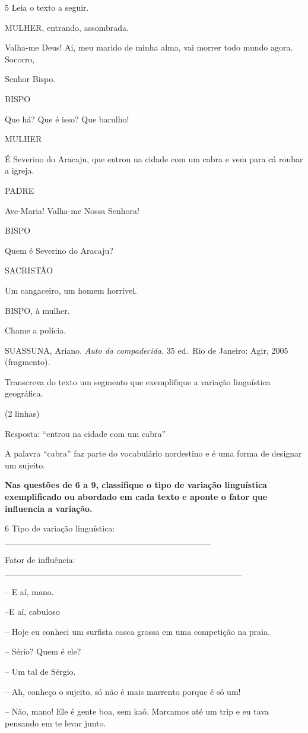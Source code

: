 \num{5} Leia o texto a seguir.

MULHER, entrando, assombrada.

Valha-me Deus! Ai, meu marido de minha alma, vai morrer todo mundo
agora. Socorro,

Senhor Bispo.

BISPO

Que há? Que é isso? Que barulho!

MULHER

É Severino do Aracaju, que entrou na cidade com um cabra e vem para cá
roubar a igreja.

PADRE

Ave-Maria! Valha-me Nossa Senhora!

BISPO

Quem é Severino do Aracaju?

SACRISTÃO

Um cangaceiro, um homem horrível.

BISPO, à mulher.

Chame a polícia.

SUASSUNA, Ariano. \emph{Auto da compadecida.} 35 ed.~Rio de Janeiro:
Agir, 2005 (fragmento).

Transcreva do texto um segmento que exemplifique a variação linguística
geográfica.

(2 linhas)

Resposta: ``entrou na cidade com um cabra''

A palavra ``cabra'' faz parte do vocabulário nordestino e é uma forma de
designar um sujeito.

\textbf{Nas questões de 6 a 9, classifique o tipo de variação
linguística exemplificado ou abordado em cada texto e aponte o fator que
influencia a variação.}

\num{6} Tipo de variação linguística:
\_\_\_\_\_\_\_\_\_\_\_\_\_\_\_\_\_\_\_\_\_\_\_\_\_\_\_\_\_\_\_\_\_

Fator de influência:
\_\_\_\_\_\_\_\_\_\_\_\_\_\_\_\_\_\_\_\_\_\_\_\_\_\_\_\_\_\_\_\_\_\_\_\_\_\_

-- E aí, mano.

--E aí, cabuloso

-- Hoje eu conheci um surfista casca grossa em uma competição na praia.

-- Sério? Quem é ele?

-- Um tal de Sérgio.

-- Ah, conheço o sujeito, só não é mais marrento porque é só um!

-- Não, mano! Ele é gente boa, sem kaô. Marcamos até um trip e eu tava
pensando em te levar junto.


